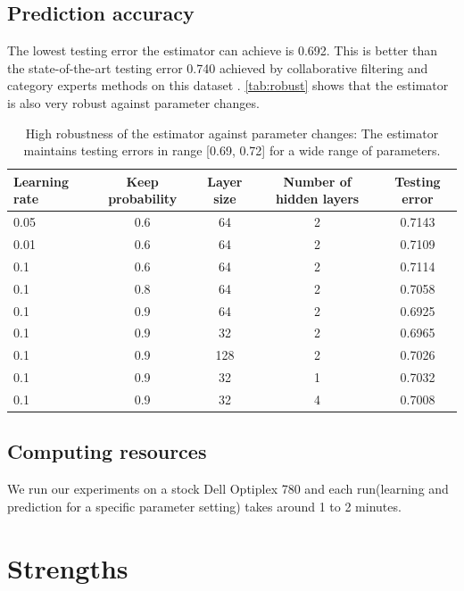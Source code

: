 \documentclass{article}
\begin{document}
\subsection{Prediction accuracy}
The lowest testing error the estimator can achieve is 0.692.
This is better than the state-of-the-art testing error 0.740 achieved by 
collaborative filtering and category experts methods on this dataset 
\cite{hwang2016efficient}.
\autoref{tab:robust} shows that the estimator is also very robust against 
parameter changes.
\begin{table}[h]
	\centering
	\caption{High robustness of the estimator against parameter changes: 
		The estimator maintains testing errors in range [0.69, 0.72] for a wide 
		range of parameters.}
	\begin{tabularx}{\textwidth}{ |X|c|c|c|c| }  \hline
		 \textbf{Learning rate} & \textbf{Keep probability} & \textbf{Layer 
		 size} & \textbf{Number of hidden layers} & \textbf{Testing error} \\ 
		 \hline
		 0.05 & 0.6 & 64 & 2 & 0.7143 \\ \hline
		 0.01 & 0.6 & 64 & 2 & 0.7109 \\ \hline
		 0.1 & 0.6 & 64 & 2 & 0.7114 \\ \hline
		 0.1 & 0.8 & 64 & 2 & 0.7058 \\ \hline
		 0.1 & 0.9 & 64 & 2 & 0.6925 \\ \hline
		 0.1 & 0.9 & 32 & 2 & 0.6965 \\ \hline
		 0.1 & 0.9 & 128 & 2 & 0.7026 \\ \hline
		 0.1 & 0.9 & 32 & 1 & 0.7032 \\ \hline
		 0.1 & 0.9 & 32 & 4 & 0.7008 \\ \hline
	\end{tabularx}
	\label{tab:robust}
\end{table}

\subsection{Computing resources}
We run our experiments on a stock Dell Optiplex 780 and each run(learning and 
prediction for a specific parameter setting) takes around 1 to 2 minutes.

\section{Strengths}
\end{document}
